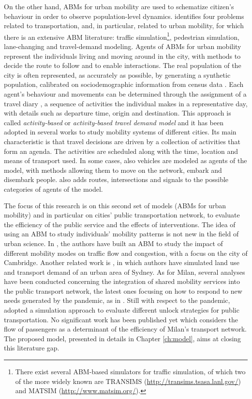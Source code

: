 On the other hand, ABMs for urban mobility are used to schematize citizen's behaviour in order to observe population-level dynamics.
\textcite{bernhardt2007agent} identifies four problems related to transportation, and, in particular, related to urban mobility, for which there is an extensive ABM literature: traffic simulation\footnote{There exist several ABM-based simulators for traffic simulation, of which two of the more widely known are TRANSIMS (\url{http://transims.tsasa.lanl.gov/}) and MATSIM (\url{http://www.matsim.org/}).}, pedestrian simulation, lane-changing and travel-demand modeling.  
Agents of ABMs for urban mobility represent the individuals living and moving around in the city, with methods to decide the route to follow and to enable interactions. The real population of the city is often represented, as accurately as possible, by generating a synthetic population, calibrated on sociodemographic information from census data \cite{bib6}. Each agent’s behaviour and movements can be determined through the assignment of a travel diary \cite{bib7}, a sequence of activities the individual makes in a representative day, with details such as departure time, origin and destination. This approach is called \textit{activity-based} \cite{bib8} or \textit{activity-based travel demand model} \cite{bib3} and it has been adopted in several works to study mobility systems of different cities. Its main characteristic is that travel decisions are driven by a collection of activities that form an agenda. The activities are scheduled along with the time, location and means of transport used.
In some cases, also vehicles are modeled as agents of the model, with methods allowing them to move on the network, embark and disembark people. \textcite{Bazghandi_techniques} also adds routes, intersections and signals to the possible categories of agents of the model. 

The focus of this research is on this second set of models (ABMs for urban mobility) and in particular on cities' public transportation network, to evaluate the efficiency of the public service and the effects of interventions. The idea of using an ABM to study individuals’ mobility patterns is not new in the field of urban science. In \textcite{bib9}, the authors have built an ABM to study the impact of different mobility modes on traffic flow and congestion, with a focus on the city of Cambridge. Another related work is \textcite{bib7}, in which authors have simulated land use and transport demand of an urban area of Sydney. As for Milan, several analyses have been conducted concerning the integration of shared mobility services into the public transport network, the latest ones focusing on how to respond to new needs generated by the pandemic, as in \textcite{bib10}. Still with respect to the pandemic, \textcite{bib11} adopted a simulation approach to evaluate different unlock strategies for public transportation. No significant work has been published yet which considers the flow of passengers as a determinant of the efficiency of Milan’s transport network. The proposed model, presented in details in Chapter \ref{ch:model}, aims at closing this literature gap. 


